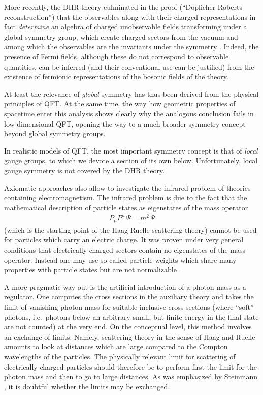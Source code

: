 \documentclass[multphys,vecphys]{svmult}
\newcommand{\bea}{\begin{eqnarray}}
\newcommand{\eea}{\end{eqnarray}}
\begin{document}
More recently, the DHR theory
culminated in the proof (``Doplicher-Roberts reconstruction'') that the
observables along with their charged representations in fact {\em
  determine} an algebra of charged unobservable fields transforming
under a global symmetry group, which create charged sectors from the
vacuum and among which the observables are the invariants under the
symmetry \cite{DR}. Indeed, the presence of Fermi fields, although
these do not correspond to observable quantities, can be inferred (and
their conventional use can be justified) from the existence of
fermionic representations of the bosonic fields of the theory.

At least the relevance of {\em global} symmetry has thus been derived
from the physical principles of QFT. At the same time, the way how
geometric properties of spacetime enter this analysis shows clearly
why the analogous conclusion fails in low
dimensional QFT, opening the way to a much
broader symmetry concept beyond global symmetry groups.  

In realistic models of QFT, the most important symmetry concept is that of 
{\em local} gauge groups, to which we devote a section of its own below. 
Unfortunately, local gauge symmetry is not covered by the
DHR theory. 

Axiomatic approaches also allow to
investigate the infrared problem of theories
containing electromagnetism. The infrared problem is due to the fact
that the mathematical description of particle states
as eigenstates of the mass operator  
\bea 
  P_\mu P^\mu\, \Psi = m^2\,\Psi 
\eea
(which is the starting point of the Haag-Ruelle scattering theory) 
cannot be used for particles which carry an electric charge. It was
proven under very general conditions \cite{Bu} that electrically
charged sectors contain no eigenstates of the mass operator. Instead
one may use so called particle weights which share
many properties with particle states but are not normalizable \cite{BPS}.  

A more pragmatic way out is the artificial introduction of a photon mass as
a regulator. One computes the cross sections in
the auxiliary theory and takes the limit of vanishing photon mass for
suitable inclusive cross sections (where ``soft'' photons, i.e.\
photons below an arbitrary small, but finite energy in the final state
are not counted) at the very end. On the conceptual level, this method
involves an exchange of limits. Namely, scattering\index{scattering}
theory in the sense of Haag and Ruelle\index{Haag-Ruelle theory}
amounts to look at distances which are large compared to the   
Compton wavelengths of the particles. The physically relevant limit for 
scattering of electrically charged particles should therefore be to perform 
first the limit for the photon mass and then to go to large distances. 
As was emphasized by Steinmann \cite{St}, it is doubtful whether the
limits may be exchanged.  
\end{document}
